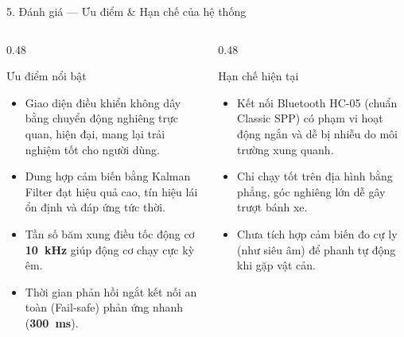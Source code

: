 \documentclass[aspectratio=169, 10pt]{beamer}
\begin{document}
\begin{frame}{5. Đánh giá — Ưu điểm \& Hạn chế của hệ thống}
  \begin{columns}[T]
    \begin{column}{0.48\textwidth}
      \begin{block}{\textcolor{MLIOTwhite}{Ưu điểm nổi bật}}
        \begin{itemize}
          \item Giao diện điều khiển không dây bằng chuyển động nghiêng trực quan, hiện đại, mang lại trải nghiệm tốt cho người dùng.
          \item Dung hợp cảm biến bằng Kalman Filter đạt hiệu quả cao, tín hiệu lái ổn định và đáp ứng tức thời.
          \item Tần số băm xung điều tốc động cơ \textbf{\qty{10}{\kilo\hertz}} giúp động cơ chạy cực kỳ êm.
          \item Thời gian phản hồi ngắt kết nối an toàn (Fail-safe) phản ứng nhanh (\textbf{\qty{300}{\ms}}).
        \end{itemize}
      \end{block}
    \end{column}
    
    \begin{column}{0.48\textwidth}
      \begin{block}{\textcolor{MLIOTwhite}{Hạn chế hiện tại}}
        \begin{itemize}
          \item Kết nối Bluetooth HC-05 (chuẩn Classic SPP) có phạm vi hoạt động ngắn và dễ bị nhiễu do môi trường xung quanh.
          \item Chỉ chạy tốt trên địa hình bằng phẳng, góc nghiêng lớn dễ gây trượt bánh xe.
          \item Chưa tích hợp cảm biến đo cự ly (như siêu âm) để phanh tự động khi gặp vật cản.
        \end{itemize}
      \end{block}
    \end{column}
  \end{columns}
\end{frame}
\end{document}
